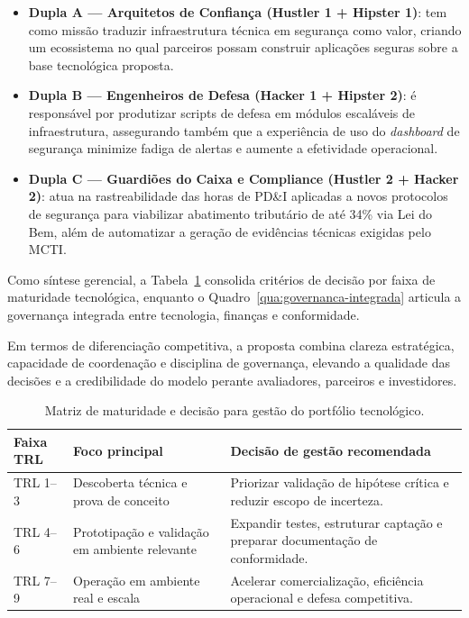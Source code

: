\begin{itemize}
    \item \textbf{Dupla A --- Arquitetos de Confiança (Hustler 1 + Hipster 1)}: tem como missão traduzir infraestrutura técnica em segurança como valor, criando um ecossistema no qual parceiros possam construir aplicações seguras sobre a base tecnológica proposta.
    \item \textbf{Dupla B --- Engenheiros de Defesa (Hacker 1 + Hipster 2)}: é responsável por produtizar scripts de defesa em módulos escaláveis de infraestrutura, assegurando também que a experiência de uso do \textit{dashboard} de segurança minimize fadiga de alertas e aumente a efetividade operacional.
    \item \textbf{Dupla C --- Guardiões do Caixa e Compliance (Hustler 2 + Hacker 2)}: atua na rastreabilidade das horas de PD\&I aplicadas a novos protocolos de segurança para viabilizar abatimento tributário de até 34\% via Lei do Bem, além de automatizar a geração de evidências técnicas exigidas pelo MCTI.
\end{itemize}

Como síntese gerencial, a Tabela~\ref{tab:trl-decisao-portfolio} consolida critérios de decisão por faixa de maturidade tecnológica, enquanto o Quadro~\ref{qua:governanca-integrada} articula a governança integrada entre tecnologia, finanças e conformidade.

Em termos de diferenciação competitiva, a proposta combina clareza estratégica, capacidade de coordenação e disciplina de governança, elevando a qualidade das decisões e a credibilidade do modelo perante avaliadores, parceiros e investidores.

\begin{table}[htb]
\centering
\caption{Matriz de maturidade e decisão para gestão do portfólio tecnológico.}
\label{tab:trl-decisao-portfolio}
\begin{tabular}{|p{}|p{}|p{}|}
\hline
\textbf{Faixa TRL} & \textbf{Foco principal} & \textbf{Decisão de gestão recomendada} \\
\hline
TRL 1--3 & Descoberta técnica e prova de conceito & Priorizar validação de hipótese crítica e reduzir escopo de incerteza. \\
\hline
TRL 4--6 & Prototipação e validação em ambiente relevante & Expandir testes, estruturar captação e preparar documentação de conformidade. \\
\hline
TRL 7--9 & Operação em ambiente real e escala & Acelerar comercialização, eficiência operacional e defesa competitiva. \\
\hline
\end{tabular}
\end{table}

